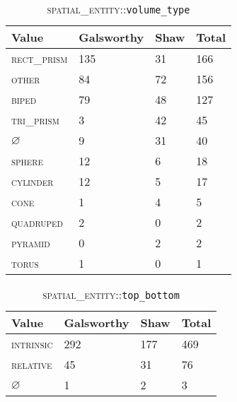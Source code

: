 \documentclass[11pt]{article}
\begin{document}
\begin{appendix}
    \begin{table}[here]
    \begin{center}
    \begin{tabular}
        {|l|l|l|l|}
        \hline  \textbf{Value} & \textbf{Galsworthy} & \textbf{Shaw} & \textbf{Total} \\
        \hline \textsc{rect\_prism} & 135 & 31 & 166 \\
        \hline \textsc{other} & 84 & 72 & 156        \\
        \hline \textsc{biped} & 79 & 48 & 127        \\
        \hline \textsc{tri\_prism} & 3 & 42 & 45     \\
        \hline $\varnothing$ & 9 & 31 & 40           \\
        \hline \textsc{sphere} & 12 & 6 & 18         \\
        \hline \textsc{cylinder} & 12 & 5 & 17       \\
        \hline \textsc{cone} & 1 & 4 & 5             \\
        \hline \textsc{quadruped} & 2 & 0 & 2        \\
        \hline \textsc{pyramid} & 0 & 2 & 2          \\
        \hline \textsc{torus} & 1 & 0 & 1            \\
        \hline
    \end{tabular}
    \caption{\textsc{spatial\_entity}::\texttt{volume\_type}}
    \label{tab:volume_type-counts}
    \end{center}
    \end{table}
    
    \begin{table}[here]
    \begin{center}
    \begin{tabular}
        {|l|l|l|l|}
        \hline  \textbf{Value} & \textbf{Galsworthy} & \textbf{Shaw} & \textbf{Total} \\
        \hline \textsc{intrinsic} & 292 & 177 & 469 \\
        \hline \textsc{relative} & 45 & 31 & 76     \\
        \hline $\varnothing$ & 1 & 2 & 3            \\
        \hline
    \end{tabular}
    \caption{\textsc{spatial\_entity}::\texttt{top\_bottom}}
    \label{tab:top_bottom-counts}
    \end{center}
    \end{table}


\end{appendix}
\end{document}
